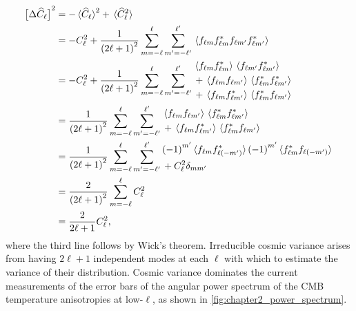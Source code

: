 \begin{align}
	\variance{\powerSpectrumHat}
	 & = - \expval*{\powerSpectrumHat}^{2} + \expval*{\powerSpectrumHat^{2}} \nonumber{}                                                                                                                     \\
	 & = - \powerSpectrum^{2} + \frac{1}{{(2\ell+1)}^{2}} \sum\limits_{m=-\ell}^{\ell} \sum\limits_{m'=-\ell'}^{\ell'} \expval*{\harmonic{f} \conj{\harmonic{f}} f_{\ell m'} \conj{f_{\ell m'}}} \nonumber{} \\
	 & = - \powerSpectrum^{2} + \frac{1}{{(2\ell+1)}^{2}} \sum\limits_{m=-\ell}^{\ell} \sum\limits_{m'=-\ell'}^{\ell'}
	\begin{aligned}
		 & \expval*{\harmonic{f} \conj{\harmonic{f}}}  \expval*{f_{\ell m'} \conj{f_{\ell m'}}} \nonumber{}  \\
		 & + \expval*{\harmonic{f} f_{\ell m'}} \expval*{\conj{\harmonic{f}} \conj{f_{\ell m'}}} \nonumber{} \\
		 & + \expval*{\harmonic{f} \conj{f_{\ell m'}}} \expval*{\conj{\harmonic{f}} f_{\ell m'}}
	\end{aligned} \nonumber{}                                          \\
	 & = \frac{1}{{(2\ell+1)}^{2}} \sum\limits_{m=-\ell}^{\ell} \sum\limits_{m'=-\ell'}^{\ell'}
	\begin{aligned}
		 & \expval*{\harmonic{f} f_{\ell m'}} \expval*{\conj{\harmonic{f}} \conj{f_{\ell m'}}} \nonumber{} \\
		 & + \expval*{\harmonic{f} \conj{f_{\ell m'}}} \expval*{\conj{\harmonic{f}} f_{\ell m'}}
	\end{aligned} \nonumber{}                                                                \\
	 & = \frac{1}{{(2\ell+1)}^{2}} \sum\limits_{m=-\ell}^{\ell} \sum\limits_{m'=-\ell'}^{\ell'}
	\begin{aligned}
		 & \phaseFactor['] \expval*{\harmonic{f} \conj{f_{\ell(-m')}}} \phaseFactor['] \expval*{\conj{\harmonic{f}} f_{\ell(-m')}} \nonumber{} \\
		 & + \powerSpectrum^{2} \delta_{m m'}
	\end{aligned} \nonumber{}                                \\
	 & = \frac{2}{{(2\ell+1)}^{2}} \sum\limits_{m=-\ell}^{\ell} \powerSpectrum^{2} \nonumber{}                                                                                                               \\
	 & = \frac{2}{2\ell+1} \powerSpectrum^{2},
\end{align}
%
where the third line follows by Wick's theorem.
Irreducible cosmic variance arises from having \(2\ell+1\) independent modes at each \(\ell{}\) with which to estimate the variance of their distribution.
Cosmic variance dominates the current measurements of the error bars of the angular power spectrum of the CMB temperature anisotropies at low-\(\ell{}\), as shown in \cref{fig:chapter2_power_spectrum}.

